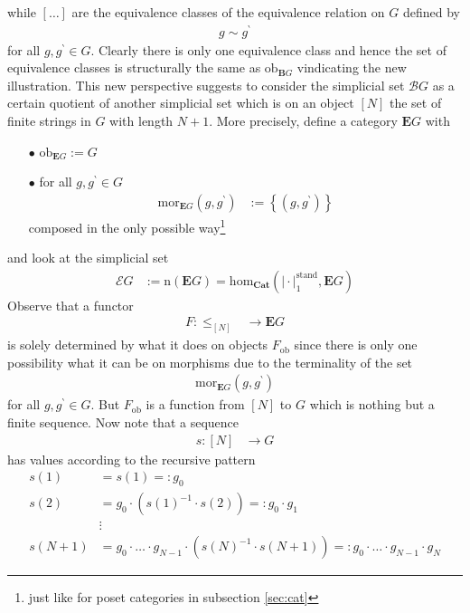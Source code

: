 while $[\ldots]$ are the equivalence classes of the equivalence relation on $G$ defined by
\begin{align*}
  g
  \sim
  g^{\backprime}
\end{align*}
for all $g,g^{\backprime} \in G$. Clearly there is only one equivalence class and hence the set of equivalence classes is structurally the same as $\mathrm{ob}_{\mathbf{B}G}$ vindicating the new illustration. This new perspective suggests to consider the simplicial set $\mathcal{B}G$ as a certain quotient of another simplicial set which is on an object $[N]$ the set of finite strings in $G$ with length $N + 1$. More precisely, define a category $\mathbf{E}G$ with
\begin{enumerate}
\item[$\bullet$]
$\mathrm{ob}_{\mathbf{E}G} := G$
\item[$\bullet$]
for all $g,g^{\backprime} \in G$
\begin{align*}
  \mathrm{mor}_{\mathbf{E}G}
  \left(
    g,
    g^{\backprime}
  \right)
  &:=
  \left\lbrace
    \left(
      g,
      g^{\backprime}
    \right)
  \right\rbrace
\end{align*}
composed in the only possible way\footnote{just like for poset categories in subsection \ref{sec:cat}}
\end{enumerate}
and look at the simplicial set
\begin{align*}
  \mathcal{E}G
  &:=
  \mathrm{n}(\mathbf{E}G)
  =
  \mathrm{hom}_{\mathbf{Cat}}
  \left(
    \vert
      \cdot
    \vert_{1}^{\textrm{stand}},
    \mathbf{E}G
  \right)
\end{align*}
Observe that a functor
\begin{align*}
  F
  \colon
  \pmb{\leq}_{[N]}
  &\rightarrow
  \mathbf{E}G
\end{align*}
is solely determined by what it does on objects $F_{\mathrm{ob}}$ since there is only one possibility what it can be on morphisms due to the terminality of the set
\begin{align*}
  \mathrm{mor}_{\mathbf{E}G}
  \left(
    g,
    g^{\backprime}
  \right)
\end{align*}
for all $g,g^{\backprime} \in G$. But $F_{\mathrm{ob}}$ is a function from $[N]$ to $G$ which is nothing but a finite sequence. Now note that a sequence
\begin{align*}
  s
  \colon
  [N]
  &\rightarrow
  G
\end{align*}
has values according to the recursive pattern
\begin{align*}
  s(1)
  &=
  s(1)
  =:
  g_{0}
  \\
  s(2)
  &=
  g_{0}
  \cdot
  \left(
    s(1)^{-1}
    \cdot
    s(2)
  \right)
  =:
  g_{0}
  \cdot
  g_{1}
  \\
  &\vdots
  \\
  s(N+1)
  &=
  g_{0}
  \cdot
  \ldots
  \cdot
  g_{N-1}
  \cdot
  \left(
    s(N)^{-1}
    \cdot
    s(N+1)
  \right)
  =:
  g_{0}
  \cdot
  \ldots
  \cdot
  g_{N-1}
  \cdot
  g_{N}
\end{align*}

